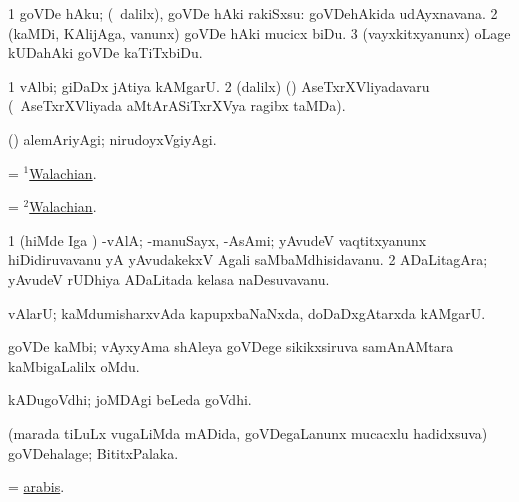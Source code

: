 \bentry
{}
\gl{\sakirx}
\expl{}
\bmng
\bnum
\num{1} goVDe hAku; (\kanmu\ \BUkaq dalilx), goVDe hAki rakiSxsu:  goVDehAkida udAyxnavana. 
\num{2} (kaMDi, KAlijAga, \mo vanunx) goVDe hAki mucicx biDu.
\num{3} (vayxkitxyanunx) oLage kUDahAki goVDe kaTiTxbiDu. 
\enum
\emng
\eentry

{} 
\gl{\nA}
\bmng
\bnum
\num{1} vAlbi; giDaDx jAtiya kAMgarU.  
\num{2}  (\bava dalilx) (\AmA) AseTxrXVliyadavaru (\kanmu\ AseTxrXVliyada aMtArASiTxrXVya ragibx taMDa). 
\enum
\emng

\noindent 
\gl{\pagu}
\expl{}
\bmng
{} (\AseTxrXV) alemAriyAgi; nirudoyxVgiyAgi. 
\emng
\eentry

\bentry
{} 
\gl{\gu}
\expl{}
\bmng
= \hyperlink{Walachian(1)}{$^1$Walachian}. 
\emng
\eentry

\bentry
{} 
\gl{\nA}
\bmng
= \hyperlink{Walachian(2)}{$^2$Walachian}. 
\emng
\eentry

\bentry
{} 
\gl{\nA}
\bmng
\bnum
\num{1} (hiMde \AMiM Iga \ashi) -vAlA; -manuSayx, -AsAmi; yAvudeV vaqtitxyanunx hiDidiruvavanu yA yAvudakekxV Agali saMbaMdhisidavanu. 
\num{2} ADaLitagAra; yAvudeV rUDhiya ADaLitada kelasa naDesuvavanu. 
\enum
\emng
\eentry

\bentry
{} 
\gl{\nA}
\bmng
vAlarU; kaMdumisharxvAda kapupxbaNaNxda, doDaDxgAtarxda kAMgarU. 
\emng
\eentry

\bentry
{} 
\gl{\nA}
\expl{}
\bmng
goVDe kaMbi; vAyxyAma shAleya goVDege sikikxsiruva samAnAMtara kaMbigaLalilx oMdu. 
\emng
\eentry

\bentry
{} 
\gl{\nA}
\expl{}
\bmng
kADugoVdhi; joMDAgi beLeda goVdhi. 
\emng
\eentry

\bentry
{} 
\gl{\nA}
\expl{}
\bmng
(marada tiLuLx \mo vugaLiMda mADida, goVDegaLanunx mucacxlu hadidxsuva) goVDehalage; BititxPalaka. 
\emng
\eentry

\bentry
{} 
\gl{\nA}
\expl{}
\bmng
= \hyperref{kandict_a.pdf}{A}{arabis}{arabis}. 
\emng
\eentry

